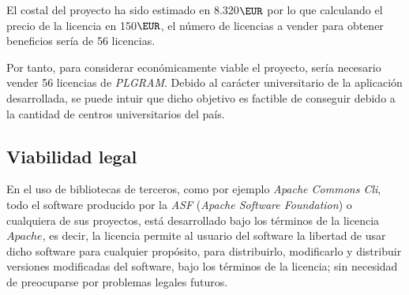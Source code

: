 El costal del proyecto ha sido estimado en 8.320$\EUR$ por lo que calculando el precio de la licencia en 150$\EUR$, el número de licencias a vender para obtener beneficios sería de 56 licencias.

Por tanto, para considerar económicamente viable el proyecto, sería necesario vender 56 licencias de \textit{PLGRAM}. Debido al carácter universitario de la aplicación desarrollada, se puede intuir que dicho objetivo es factible de conseguir debido a la cantidad de centros universitarios del país.

\subsection{Viabilidad legal}

En el uso de bibliotecas de terceros, como por ejemplo \textit{Apache Commons Cli}, todo el software producido por la \textit{ASF} (\textit{Apache Software Foundation}) o cualquiera de sus proyectos, está desarrollado bajo los términos de la licencia $Apache$, es decir, la licencia permite al usuario del software la libertad de usar dicho software para cualquier propósito, para distribuirlo, modificarlo y distribuir versiones modificadas del software, bajo los términos de la licencia; sin necesidad de preocuparse por problemas legales futuros.

